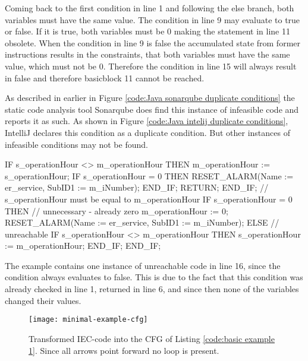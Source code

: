 Coming back to the first condition in line 1 and following the else branch, both variables must have the same value. The condition in line 9 may evaluate to true or false. If it is true, both variables must be 0 making the statement in line 11 obsolete. When the condition in line 9 is false the accumulated state from former instructions results in the constraints, that both variables must have the same value, which must not be 0. Therefore the condition in line 15 will always result in false and therefore basicblock 11 cannot be reached. 

As described in earlier in Figure \ref{code:Java sonarqube duplicate conditions} the static code analysis tool Sonarqube \cite{sonarqube} does find this instance of infeasible code and reports it as such. As shown in Figure \ref{code:Java intelij duplicate conditions}, IntelliJ \cite{IntelliJIDEACapable} declares this condition as a duplicate condition. But other instances of infeasible conditions may not be found. 




\begin{program}[h!]
	\begin{GenericCode}
IF s_operationHour <> m_operationHour THEN
	m_operationHour := s_operationHour;
	IF s_operationHour = 0 THEN
		RESET_ALARM(Name := er_service, SubID1 := m_iNumber);
	END_IF;
	RETURN;
END_IF;
// s_operationHour must be equal to m_operationHour
IF s_operationHour = 0 THEN
	// unnecessary - already zero
	m_operationHour := 0;
	RESET_ALARM(Name := er_service, SubID1 := m_iNumber);
ELSE
	// unreachable
	IF s_operationHour <> m_operationHour THEN
		s_operationHour := m_operationHour;
	END_IF;
END_IF;
	\end{GenericCode}
	\caption{The example contains one instance of unreachable code in line 16, since the condition always evaluates to false. This is due to the fact that this condition was already checked in line 1, returned in line 6, and since then none of the variables changed their values.}
	\label{code:basic example 1}
\end{program}

\begin{figure}[h!]
	\centering
	\texttt{[image: minimal-example-cfg]}
	\caption{Transformed IEC-code into the CFG of Listing \ref{code:basic example 1}. Since all arrows point forward no loop is present.}
	\label{fig:basic example 1 cfg}
\end{figure}

